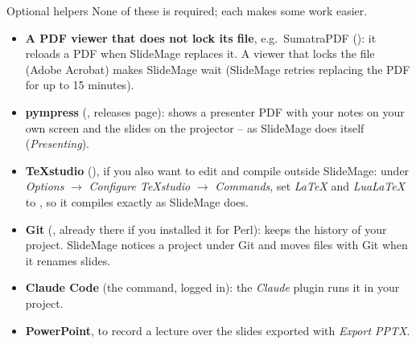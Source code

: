 
\begin{standardframe}{Optional helpers}
	\small
	None of these is required; each makes some work easier.
	\par\medskip
	\begin{itemize}
		\item \textbf{A PDF viewer that does not lock its file}, e.g.\ SumatraPDF (): it reloads a PDF when SlideMage replaces it. A viewer that locks the file (Adobe Acrobat) makes SlideMage wait (SlideMage retries replacing the PDF for up to 15 minutes).
		\item \textbf{pympress} (, releases page): shows a presenter PDF with your notes on your own screen and the slides on the projector -- as SlideMage does itself (\emph{Presenting}).
		\item \textbf{TeXstudio} (), if you also want to edit and compile outside SlideMage: under \emph{Options} $\rightarrow$ \emph{Configure TeXstudio} $\rightarrow$ \emph{Commands}, set \emph{LaTeX} and \emph{LuaLaTeX} to , so it compiles exactly as SlideMage does.
		\item \textbf{Git} (, already there if you installed it for Perl): keeps the history of your project. SlideMage notices a project under Git and moves files with Git when it renames slides.
		\item \textbf{Claude Code} (the  command, logged in): the \emph{Claude} plugin runs it in your project.
		\item \textbf{PowerPoint}, to record a lecture over the slides exported with \emph{Export PPTX}.
	\end{itemize}
\end{standardframe}
